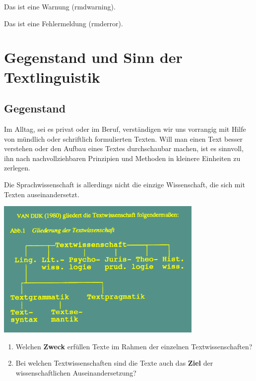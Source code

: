 \documentclass[
  letterpaper,
  DIV=11,
  numbers=noendperiod]{scrreprt}
\providecommand{\tightlist}{%
  \setlength{\itemsep}{0pt}\setlength{\parskip}{0pt}}\usepackage{longtable,booktabs,array}
\begin{document}
Das ist eine Warnung (rmdwarning).

Das ist eine Fehlermeldung (rmderror).


\hypertarget{sec-gegenstand}{%
\chapter{Gegenstand und Sinn der Textlinguistik}\label{sec-gegenstand}}

\hypertarget{gegenstand}{%
\section{Gegenstand}\label{gegenstand}}

Im Alltag, sei es privat oder im Beruf, verständigen wir uns vorrangig
mit Hilfe von mündlich oder schriftlich formulierten Texten. Will man
einen Text besser verstehen oder den Aufbau eines Textes durchschaubar
machen, ist es sinnvoll, ihn nach nachvollziehbaren Prinzipien und
Methoden in kleinere Einheiten zu zerlegen.

Die Sprachwissenschaft is allerdings nicht die einzige Wissenschaft, die
sich mit Texten auseinandersetzt.

\includegraphics[width=0.75\textwidth,height=\textheight]{./pictures/textwissenschaften.png}

\begin{enumerate}
\def\labelenumi{\arabic{enumi}.}
\tightlist
\item
  Welchen \textbf{Zweck} erfüllen Texte im Rahmen der einzelnen
  Textwissenschaften?\\
\item
  Bei welchen Textwissenschaften sind die Texte auch das \textbf{Ziel}
  der wissenschaftlichen Auseinandersetzung?
\end{enumerate}
\end{document}
